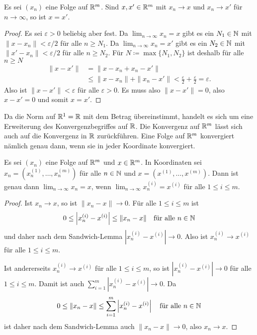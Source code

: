 \documentclass[a4paper,10pt]{article}
\begin{document}
\begin{lem}
 Es sei $(x_n)$ eine Folge auf $\mathbb{R}^m$. Sind $x, x' \in \mathbb{R}^m$ mit $x_n \to x$ und $x_n \to x'$ für $n \to \infty$, so ist $x = x'$.
\end{lem}
\begin{proof}
 Es sei $\varepsilon > 0$ beliebig aber fest. Da $\lim_{n \to \infty} x_n = x$ gibt es ein $N_1 \in \mathbb{N}$ mit $\|x - x_n\| < \varepsilon/2$  für alle $n \geq N_1$. Da $\lim_{n \to \infty} x_n = x'$ gibt es ein $N_2 \in \mathbb{N}$ mit $\|x' - x_n\| < \varepsilon/2$  für alle $n \geq N_2$. Für $N \coloneqq \max\{N_1, N_2\}$ ist deshalb für alle $n \geq N$
 \begin{align*}
  \|x-x'\|
  &= \|x-x_n + x_n-x'\| \\
  &\leq \|x-x_n\| + \|x_n-x'\|
  < \frac{\varepsilon}{2} + \frac{\varepsilon}{2}
  = \varepsilon.
 \end{align*}
 Also ist $\|x-x'\| < \varepsilon$ für alle $\varepsilon > 0$. Es muss also $\|x-x'\| = 0$, also $x-x' = 0$ und somit $x = x'$.
\end{proof}


Da die Norm auf $\mathbb{R}^1 = \mathbb{R}$ mit dem Betrag übereinstimmt, handelt es sich um eine Erweiterung des Konvergenzbegriffes auf $\mathbb{R}$. Die Konvergenz auf $\mathbb{R}^m$ lässt sich auch auf die Konvergenz in $\mathbb{R}$ zurückführen. Eine Folge auf $\mathbb{R}^m$ konvergiert nämlich genau dann, wenn sie in jeder Koordinate konvergiert.


\begin{lem}\label{lem: convergence in coordinates}
 Es sei $(x_n)$ eine Folge auf $\mathbb{R}^m$ und $x \in \mathbb{R}^m$. In Koordinaten sei $x_n = (x^{(1)}_n, \dotsc, x^{(m)}_n)$ für alle $n \in \mathbb{N}$ und $x = (x^{(1)}, \dotsc, x^{(m)})$. Dann ist genau dann $\lim_{n \to \infty} x_n = x$, wenn $\lim_{n \to \infty} x^{(i)}_n = x^{(i)}$ für alle $1 \leq i \leq m$.
\end{lem}
\begin{proof}
 Ist $x_n \to x$, so ist $\|x_n - x\| \to 0$. Für alle $1 \leq i \leq m$ ist
 \[
  0 \leq \left|x^{(i)}_n - x^{(i)}\right| \leq \|x_n - x\| \quad \text{für alle $n \in \mathbb{N}$}
 \]
 und daher nach dem Sandwich-Lemma $|x^{(i)}_n - x^{(i)}| \to 0$. Also ist $x^{(i)}_n \to x^{(i)}$ für alle $1 \leq i \leq m$.
 
 Ist andererseits $x^{(i)}_n \to x^{(i)}$ für alle $1 \leq i \leq m$, so ist $|x^{(i)}_n - x^{(i)}| \to 0$ für alle $1 \leq i \leq m$. Damit ist auch $\sum_{i=1}^m |x^{(i)}_n - x^{(i)}| \to 0$. Da
 \[
  0 \leq \|x_n - x\| \leq \sum_{i=1}^m \left|x^{(i)}_n - x^{(i)}\right| \quad \text{für alle $n \in \mathbb{N}$}
 \]
 ist daher nach dem Sandwich-Lemma auch $\|x_n - x\| \to 0$, also $x_n \to x$.
\end{proof}
\end{document}
